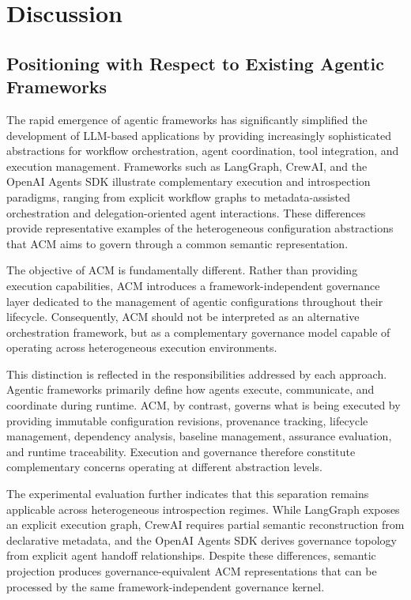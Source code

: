 \documentclass[10pt]{article}
\begin{document}
\section{Discussion}
\label{sec:discussion}
\subsection{Positioning with Respect to Existing Agentic Frameworks}
\label{sec:positioning}

The rapid emergence of agentic frameworks has significantly simplified the development of LLM-based applications by providing increasingly sophisticated abstractions for workflow orchestration, agent coordination, tool integration, and execution management. Frameworks such as LangGraph, CrewAI, and the OpenAI Agents SDK illustrate complementary execution and introspection paradigms, ranging from explicit workflow graphs to metadata-assisted orchestration and delegation-oriented agent interactions. These differences provide representative examples of the heterogeneous configuration abstractions that ACM aims to govern through a common semantic representation.

The objective of ACM is fundamentally different. Rather than providing execution capabilities, ACM introduces a framework-independent governance layer dedicated to the management of agentic configurations throughout their lifecycle. Consequently, ACM should not be interpreted as an alternative orchestration framework, but as a complementary governance model capable of operating across heterogeneous execution environments.

This distinction is reflected in the responsibilities addressed by each approach. Agentic frameworks primarily define how agents execute, communicate, and coordinate during runtime. ACM, by contrast, governs what is being executed by providing immutable configuration revisions, provenance tracking, lifecycle management, dependency analysis, baseline management, assurance evaluation, and runtime traceability. Execution and governance therefore constitute complementary concerns operating at different abstraction levels.

The experimental evaluation further indicates that this separation remains applicable across heterogeneous introspection regimes. While LangGraph exposes an explicit execution graph, CrewAI requires partial semantic reconstruction from declarative metadata, and the OpenAI Agents SDK derives governance topology from explicit agent handoff relationships. Despite these differences, semantic projection produces governance-equivalent ACM representations that can be processed by the same framework-independent governance kernel.
\end{document}
